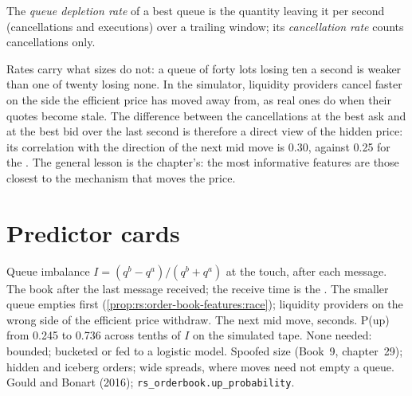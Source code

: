\begin{definition}\label{def:rs:order-book-features:depletion}
The \emph{queue depletion rate} of a best queue is the quantity leaving it per second (cancellations and
executions) over a trailing window; its \emph{cancellation rate} counts cancellations only.
\end{definition}

Rates carry what sizes do not: a queue of forty lots losing ten a second is weaker than one of twenty losing none. In the simulator,
liquidity providers cancel faster on the side the efficient price has moved away from, as real ones do when their quotes become stale.
The difference between the cancellations at the best ask and at the best bid over the last second is therefore a direct view of the
hidden price: its correlation with the direction of the next mid move is 0.30, against 0.25 for the . The general lesson
is the chapter's: the most informative features are those closest to the mechanism that moves the price.

\section{Predictor cards}

\begin{predictorcard}{Queue imbalance}\label{pred:rs:order-book-features:imbalance}
 $I = (q^b - q^a)/(q^b + q^a)$ at the touch, after each message.
 The book after the last message received; the receive time is the .
 The smaller queue empties first (\cref{prop:rs:order-book-features:race}); liquidity providers on the wrong side of the
efficient price withdraw.
 The next mid move, seconds. P(up) from 0.245 to 0.736 across tenths of $I$ on the simulated tape.
 None needed: bounded; bucketed or fed to a logistic model.
 Spoofed size (Book~9, chapter~29); hidden and iceberg orders; wide spreads, where moves need not empty a queue.
 Gould and Bonart (2016); \texttt{rs\_orderbook.up\_probability}.
\end{predictorcard}

